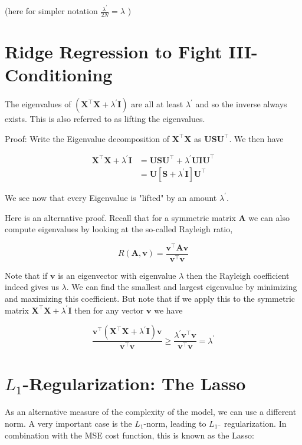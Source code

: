 (here for simpler notation $\frac{\lambda^{\prime}}{2 N}=\lambda$ )

\section*{Ridge Regression to Fight III-Conditioning}
The eigenvalues of $\left(\mathbf{X}^{\top} \mathbf{X}+\lambda^{\prime} \mathbf{I}\right)$ are all at least $\lambda^{\prime}$ and so the inverse always exists. This is also referred to as lifting the eigenvalues.

Proof: Write the Eigenvalue decomposition of $\mathbf{X}^{\top} \mathbf{X}$ as $\mathbf{U S U}^{\top}$. We then have

$$
\begin{aligned}
\mathbf{X}^{\top} \mathbf{X}+\lambda^{\prime} \mathbf{I} & =\mathbf{U S} \mathbf{U}^{\top}+\lambda^{\prime} \mathbf{U I U}^{\top} \\
& =\mathbf{U}\left[\mathbf{S}+\lambda^{\prime} \mathbf{I}\right] \mathbf{U}^{\top}
\end{aligned}
$$

We see now that every Eigenvalue is "lifted" by an amount $\lambda^{\prime}$.

Here is an alternative proof. Recall that for a symmetric matrix $\mathbf{A}$ we can also compute eigenvalues by looking at the so-called Rayleigh ratio,

$$
R(\mathbf{A}, \mathbf{v})=\frac{\mathbf{v}^{\top} \mathbf{A} \mathbf{v}}{\mathbf{v}^{\top} \mathbf{v}}
$$

Note that if $\mathbf{v}$ is an eigenvector with eigenvalue $\lambda$ then the Rayleigh coefficient indeed gives us $\lambda$. We can find the smallest and largest eigenvalue by minimizing and maximizing this coefficient. But note that if we apply this to the symmetric matrix $\mathbf{X}^{\top} \mathbf{X}+\lambda^{\prime} \mathbf{I}$ then for any vector $\mathbf{v}$ we have

$$
\frac{\mathbf{v}^{\top}\left(\mathbf{X}^{\top} \mathbf{X}+\lambda^{\prime} \mathbf{I}\right) \mathbf{v}}{\mathbf{v}^{\top} \mathbf{v}} \geq \frac{\lambda^{\prime} \mathbf{v}^{\top} \mathbf{v}}{\mathbf{v}^{\top} \mathbf{v}}=\lambda^{\prime}
$$

\section*{$L_{1}$-Regularization: The Lasso}
As an alternative measure of the complexity of the model, we can use a different norm. A very important case is the $L_{1}$-norm, leading to $L_{1^{-}}$ regularization. In combination with the MSE cost function, this is known as the Lasso:


